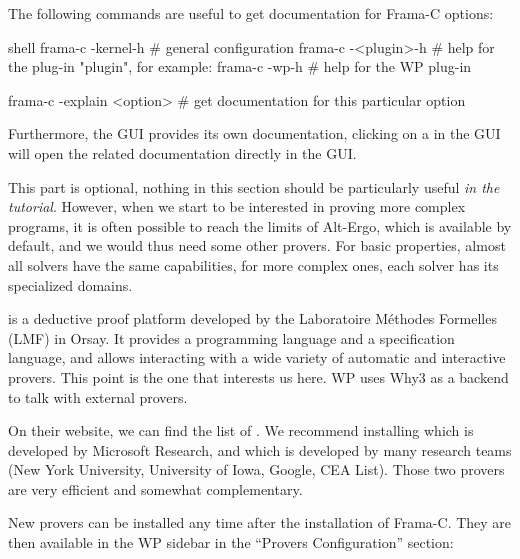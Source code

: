 

The following commands are useful to get documentation for Frama-C options:
\begin{CodeBlock}{shell}
frama-c -kernel-h # general configuration
frama-c -<plugin>-h # help for the plug-in "plugin", for example:
frama-c -wp-h # help for the WP plug-in

frama-c -explain <option> # get documentation for this particular option
\end{CodeBlock}


Furthermore, the GUI provides its own documentation, clicking on a
 in the GUI will open the related documentation directly in the
GUI.




This part is optional, nothing in this section should be particularly
useful \emph{in the tutorial}. However, when we start to be interested
in proving more complex programs, it is often possible to reach the
limits of Alt-Ergo, which is available by default, and we would thus need
some other provers. For basic properties, almost all solvers have the
same capabilities, for more complex ones, each solver has its specialized
domains.




 is a deductive proof platform developed
by the Laboratoire Méthodes Formelles (LMF) in Orsay. It provides a programming
language and a specification language, and allows interacting with a wide
variety of automatic and interactive provers. This point is the one that
interests us here. WP uses Why3 as a backend to talk with external provers.


On their website, we can find the list of
.
We recommend installing
 which is
developed by Microsoft Research, and
 which is developed by many
research teams (New York University, University of Iowa, Google, CEA
List). Those two provers are very efficient and somewhat complementary.


New provers can be installed any time after the installation of Frama-C. They
are then available in the WP sidebar in the ``Provers Configuration'' section:






